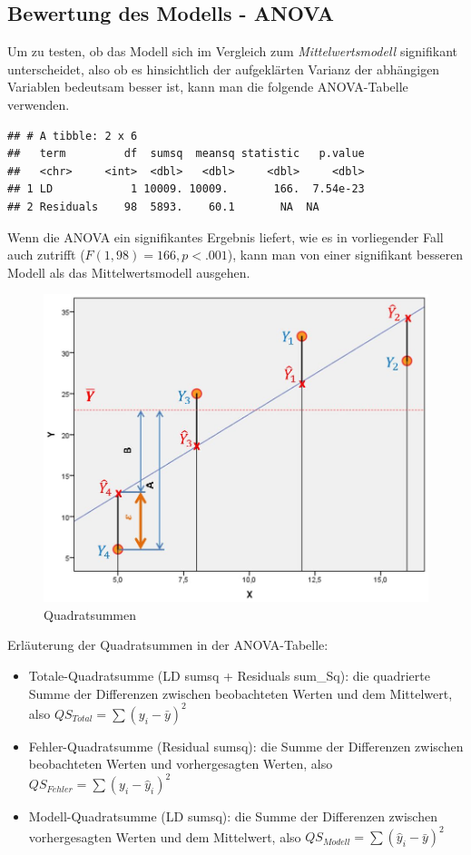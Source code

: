 \documentclass[
]{article}
\providecommand{\tightlist}{%
  \setlength{\itemsep}{0pt}\setlength{\parskip}{0pt}}
\begin{document}
\subsection*{Bewertung des Modells - ANOVA}\label{bewertung-des-modells---anova}

Um zu testen, ob das Modell sich im Vergleich zum \textit{Mittelwertsmodell} signifikant unterscheidet, also ob es hinsichtlich der aufgeklärten Varianz der abhängigen Variablen bedeutsam besser ist, kann man die folgende ANOVA-Tabelle verwenden.

\begin{verbatim}
## # A tibble: 2 x 6
##   term         df  sumsq  meansq statistic   p.value
##   <chr>     <int>  <dbl>   <dbl>     <dbl>     <dbl>
## 1 LD            1 10009. 10009.       166.  7.54e-23
## 2 Residuals    98  5893.    60.1       NA  NA
\end{verbatim}

Wenn die ANOVA ein signifikantes Ergebnis liefert, wie es in vorliegender Fall auch zutrifft (\(F(1,98) = 166, p < .001\)), kann man von einer signifikant besseren Modell als das Mittelwertsmodell ausgehen.

\begin{figure}
\centering
\includegraphics{images/Regression.jpg}
\caption{Quadratsummen}
\end{figure}

Erläuterung der Quadratsummen in der ANOVA-Tabelle:

\begin{itemize}
\tightlist
\item
  Totale-Quadratsumme (LD sumsq + Residuals sum\_Sq): die quadrierte Summe der Differenzen zwischen beobachteten Werten und dem Mittelwert, also \(QS_{Total} = \sum (y_i - \bar{y})^2\)
\item
  Fehler-Quadratsumme (Residual sumsq): die Summe der Differenzen zwischen beobachteten Werten und vorhergesagten Werten, also \(QS_{Fehler} = \sum (y_i - \hat{y}_i)^2\)
\item
  Modell-Quadratsumme (LD sumsq): die Summe der Differenzen zwischen vorhergesagten Werten und dem Mittelwert, also \(QS_{Modell} = \sum (\hat{y}_i - \bar{y})^2\)
\end{itemize}
\end{document}
